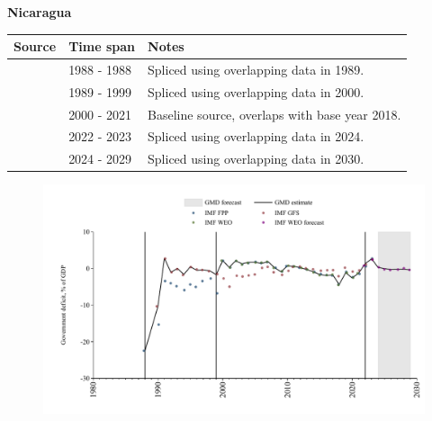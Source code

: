 \documentclass[12pt,a4paper,landscape]{article}
\begin{document}
\begin{adjustbox}{max totalsize={\paperwidth}{\paperheight},center}
\begin{minipage}[t][\textheight][t]{\textwidth}
\vspace*{0.5cm}
{}
\begin{center}
{\Large\bfseries Nicaragua}
\end{center}
\vspace{0.5cm}
\begin{table}[H]
\centering
\small
\begin{tabular}{|l|l|l|}
\hline
\textbf{Source} & \textbf{Time span} & \textbf{Notes} \\
\hline
\rowcolor{white}\cite{IMF_FPP}& 1988 - 1988 &Spliced using overlapping data in 1989.\\
\rowcolor{lightgray}\cite{IMF_GFS}& 1989 - 1999 &Spliced using overlapping data in 2000.\\
\rowcolor{white}\cite{IMF_WEO}& 2000 - 2021 &Baseline source, overlaps with base year 2018.\\
\rowcolor{lightgray}\cite{IMF_GFS}& 2022 - 2023 &Spliced using overlapping data in 2024.\\
\rowcolor{white}\cite{IMF_WEO_forecast}& 2024 - 2029 &Spliced using overlapping data in 2030.\\
\hline
\end{tabular}
\end{table}
\begin{figure}[H]
\centering
\includegraphics[width=\textwidth,height=0.6\textheight,keepaspectratio]{graphs/NIC_govdef_GDP.pdf}
\end{figure}
\end{minipage}
\end{adjustbox}
\end{document}
